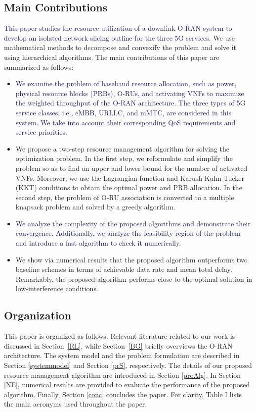 \documentclass[lettersize,journal]{IEEEtran}
\begin{document}
\subsection{Main Contributions}
\textcolor{MidnightBlue}{This paper studies the resource utilization of a downlink O-RAN system to develop an isolated network slicing outline for the three 5G services.}
We use mathematical methods to decompose and convexify the problem and solve it using hierarchical algorithms.
 The main contributions of this paper are summarized as follows:
\begin{itemize}
\item \textcolor{MidnightBlue}{We examine the problem of baseband resource allocation, such as power, physical resource blocks (PRBs), O-RUs, and activating VNFs to maximize the weighted throughput of the O-RAN architecture. The three types of 5G service classes, i.e., eMBB, URLLC, and mMTC, are considered in this system. We take into account their corresponding QoS requirements and service priorities.}
\item We propose a two-step resource management algorithm for solving the optimization problem.
In the first step, we reformulate and simplify the problem so as to find an upper and lower bound for the number of activated VNFs. Moreover, we use the Lagrangian function and Karush-Kuhn-Tucker (KKT) conditions to obtain the optimal power and PRB allocation. In the second step, the problem of O-RU association is converted to a multiple knapsack problem and solved by a greedy algorithm.
\item \textcolor{MidnightBlue}{We analyze the complexity of the proposed algorithms and demonstrate their convergence. Additionally, we analyze the feasibility region of the problem and introduce a fast algorithm to check it numerically.}
\item We show via numerical results that the proposed algorithm outperforms two baseline schemes in terms of achievable data rate and mean total delay. Remarkably, the proposed algorithm performs close to the optimal solution in low-interference conditions.
\end{itemize}

\subsection{Organization}
This paper is organized as follows.
Relevant literature related to our work is discussed in Section~\ref{RL}, while Section~\ref{BG} briefly overviews the O-RAN architecture.
The system model and the problem formulation are described in Section \ref{systemmodel} and Section \ref{prS}, respectively. The details of our proposed resource management algorithm are introduced in Section \ref{proAlg}. In Section \ref{NE}, numerical results are provided to evaluate the performance of the proposed algorithm. Finally, Section \ref{conc} concludes the paper. For clarity, Table I lists the main acronyms used throughout the paper.
\end{document}
